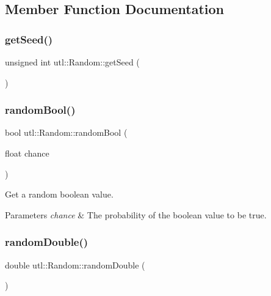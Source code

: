 \subsection{Member Function Documentation}
\mbox{\label{classutl_1_1_random_a88abb8994dd315ddc0d44707752f4150}} 
\subsubsection{\texorpdfstring{get\+Seed()}{getSeed()}}
{\footnotesize\ttfamily unsigned int utl\+::\+Random\+::get\+Seed (\begin{DoxyParamCaption}{ }\end{DoxyParamCaption})\hspace{0.3cm}{\ttfamily [static]}}

\mbox{\label{classutl_1_1_random_a946070e88d52bb580038257acfe81b1c}} 
\subsubsection{\texorpdfstring{random\+Bool()}{randomBool()}}
{\footnotesize\ttfamily bool utl\+::\+Random\+::random\+Bool (\begin{DoxyParamCaption}\item[{float}]{chance }\end{DoxyParamCaption})\hspace{0.3cm}{\ttfamily [static]}}

Get a random boolean value. 
\begin{DoxyParams}{Parameters}
{\em chance} & The probability of the boolean value to be true. \\
\hline
\end{DoxyParams}
\mbox{\label{classutl_1_1_random_a984348e7f72f1e6f57de11ac984c4544}} 
\subsubsection{\texorpdfstring{random\+Double()}{randomDouble()}\hspace{0.1cm}{\footnotesize\ttfamily [1/2]}}
{\footnotesize\ttfamily double utl\+::\+Random\+::random\+Double (\begin{DoxyParamCaption}{ }\end{DoxyParamCaption})\hspace{0.3cm}{\ttfamily [static]}}

